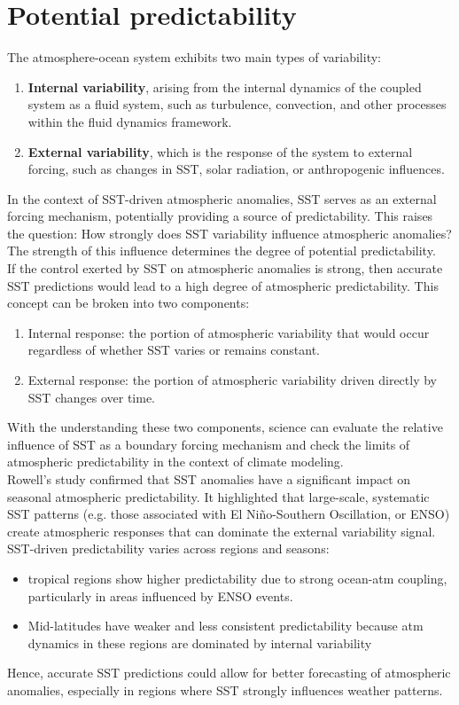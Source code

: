 \section{Potential predictability} The atmosphere-ocean system exhibits two main types of variability:
\begin{enumerate}
	\item \textbf{Internal variability}, arising from the internal dynamics of the coupled system as a fluid system, such as turbulence, convection, and other processes within the fluid dynamics framework.
	\item \textbf{External variability}, which is the response of the system to external forcing, such as changes in SST, solar radiation, or anthropogenic influences.
\end{enumerate}
In the context of SST-driven atmospheric anomalies, SST serves as an external forcing mechanism, potentially providing a source of predictability. This raises the question: How strongly does SST variability influence atmospheric anomalies? The strength of this influence determines the degree of potential predictability.\\

If the control exerted by SST on atmospheric anomalies is strong, then accurate SST predictions would lead to a high degree of atmospheric predictability. This concept can be broken into two components:
\begin{enumerate}
	\item Internal response: the portion of atmospheric variability that would occur regardless of whether SST varies or remains constant.
	\item External response: the portion of atmospheric variability driven directly by SST changes over time.
\end{enumerate}
With the understanding these two components, science can evaluate the relative influence of SST as a boundary forcing mechanism and check the limits of atmospheric predictability in the context of climate modeling. \\


Rowell's study confirmed that SST anomalies have a significant impact on seasonal atmospheric predictability. It highlighted that large-scale, systematic SST patterns (e.g. those associated with El Niño-Southern Oscillation, or ENSO) create atmospheric responses that can dominate the external variability signal.
SST-driven predictability varies across regions and seasons:
\begin{itemize}
	\item tropical regions show higher predictability due to strong ocean-atm coupling, particularly in areas influenced by ENSO events.
	\item Mid-latitudes have weaker and less consistent predictability because atm dynamics in these regions are dominated by internal variability
\end{itemize}
Hence, accurate SST predictions could allow for better forecasting of atmospheric anomalies, especially in regions where SST strongly influences weather patterns.\\
[0.2cm]


